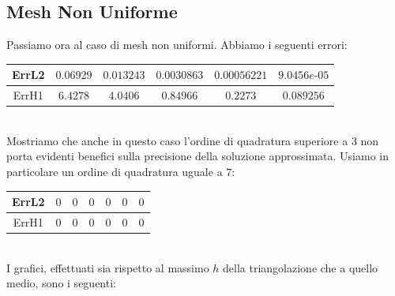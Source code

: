 \documentclass[12pt,a4paper]{report}
\theoremstyle{theorem}
\theoremstyle{theorem}
\theoremstyle{definition}
\begin{document}
\subsection{Mesh Non Uniforme}
Passiamo ora al caso di mesh non uniformi. Abbiamo i seguenti errori: \\
\begin{table}[!h]
\centering
\begin{tabular}{ | c | c | c | c | c | c | }
\hline
ErrL2	&	$0.06929$ &	$0.013243$	 & $0.0030863$	 & $0.00056221$ & $9.0456e\text{-}05$ \\ \hline 
ErrH1	&	$6.4278$ &	$4.0406$	 & $0.84966$	 & $0.2273    $ & $0.089256$ \\ \hline
\end{tabular}
\end{table}
\hfill \\
Mostriamo che anche in questo caso l'ordine di quadratura superiore a $3$ non porta evidenti benefici sulla precisione della soluzione approssimata. Usiamo in particolare un ordine di quadratura uguale a $7$:
\begin{table}[!h]
\centering
\begin{tabular}{ | c | c | c | c | c | c | c | }
\hline
ErrL2	&	$0$ & $0$ & $0$ & $0$  & $0$ & $0$ \\ \hline 
ErrH1	&	$0$ &	$0$	 & $0$	 & $0$ & $0$ & $0$ \\ \hline 
\end{tabular}
\end{table}
\hfill \\
I grafici, effettuati sia rispetto al massimo $h$ della triangolazione che a quello medio, sono i seguenti:
\end{document}
